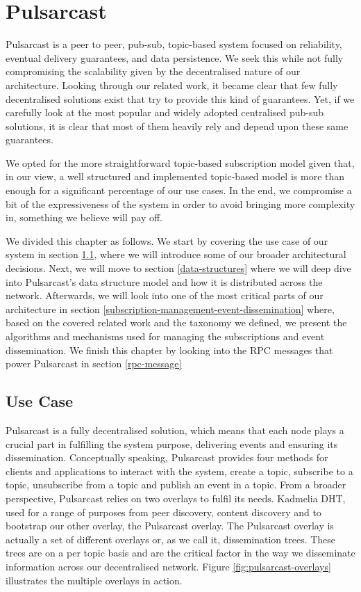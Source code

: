 
\chapter{Pulsarcast}
\label{chapter:pulsarcast}

Pulsarcast is a peer to peer, pub-sub, topic-based system focused on
reliability, eventual delivery guarantees, and data persistence. We seek this
while not fully compromising the scalability given by the decentralised nature
of our architecture. Looking through our related work, it became clear that few
fully decentralised solutions exist that try to provide this kind of
guarantees. Yet, if we carefully look at the most popular and widely adopted
centralised pub-sub solutions, it is clear that most of them heavily rely and
depend upon these same guarantees. 

We opted for the more straightforward topic-based subscription model given
that, in our view, a well structured and implemented topic-based model is more
than enough for a significant percentage of our use cases. In the end, we
compromise a bit of the expressiveness of the system in order to avoid bringing
more complexity in, something we believe will pay off.

We divided this chapter as follows. We start by covering the use case of our
system in section \ref{use-case}, where we will introduce some of our broader
architectural decisions. Next, we will move to section \ref{data-structures}
where we will deep dive into Pulsarcast's data structure model and how it is
distributed across the network. Afterwards, we will look into one of the most
critical parts of our architecture in section
\ref{subscription-management-event-dissemination} where, based on the covered
related work and the taxonomy we defined, we present the algorithms and
mechanisms used for managing the subscriptions and event dissemination. We
finish this chapter by looking into the RPC messages that power Pulsarcast in
section \ref{rpc-message}

\section{Use Case}\label{use-case}

Pulsarcast is a fully decentralised solution, which means that each node plays
a crucial part in fulfilling the system purpose, delivering events and ensuring
its dissemination. Conceptually speaking, Pulsarcast provides four methods for
clients and applications to interact with the system, create a topic, subscribe
to a topic, unsubscribe from a topic and publish an event in a topic. From a
broader perspective, Pulsarcast relies on two overlays to fulfil its needs.
Kadmelia DHT, used for a range of purposes from peer discovery, content
discovery and to bootstrap our other overlay, the Pulsarcast overlay. The
Pulsarcast overlay is actually a set of different overlays or, as we call it,
dissemination trees.  These trees are on a per topic basis and are the critical
factor in the way we disseminate information across our decentralised network.
Figure \ref{fig:pulsarcast-overlays} illustrates the multiple overlays in
action.

